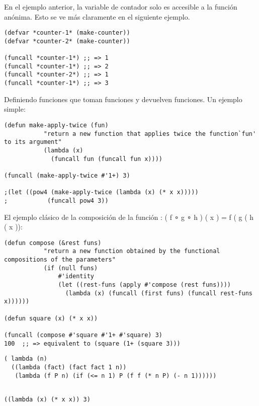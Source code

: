 \documentclass[11pt]{article}
\begin{document}
\begin{itemize}
\begin{verbatim}
\end{verbatim}

En el ejemplo anterior, la variable de contador solo es accesible a la
función anónima. Esto se ve más claramente en el siguiente ejemplo.

\begin{verbatim}
(defvar *counter-1* (make-counter))
(defvar *counter-2* (make-counter))

(funcall *counter-1*) ;; => 1
(funcall *counter-1*) ;; => 2
(funcall *counter-2*) ;; => 1
(funcall *counter-1*) ;; => 3

\end{verbatim}
Definiendo funciones que toman funciones y devuelven funciones.
Un ejemplo simple:

\begin{verbatim}
(defun make-apply-twice (fun)
           "return a new function that applies twice the function`fun' to its argument"
           (lambda (x)
             (funcall fun (funcall fun x))))

(funcall (make-apply-twice #'1+) 3)

;(let ((pow4 (make-apply-twice (lambda (x) (* x x)))))
;           (funcall pow4 3))

\end{verbatim}

El ejemplo clásico de la composición de la función : ( f ∘ g ∘ h ) ( x ) = f ( g ( h ( x )):

\begin{verbatim}
(defun compose (&rest funs)
           "return a new function obtained by the functional compositions of the parameters"
           (if (null funs) 
               #'identity
               (let ((rest-funs (apply #'compose (rest funs))))
                 (lambda (x) (funcall (first funs) (funcall rest-funs x))))))

(defun square (x) (* x x))

(funcall (compose #'square #'1+ #'square) 3)
100  ;; => equivalent to (square (1+ (square 3)))

\end{verbatim}


\begin{verbatim}
( lambda (n)
  ((lambda (fact) (fact fact 1 n))
   (lambda (f P n) (if (<= n 1) P (f f (* n P) (- n 1))))))


\end{verbatim}

\begin{verbatim}
((lambda (x) (* x x)) 3)
\end{verbatim}
\end{itemize}
\end{document}
